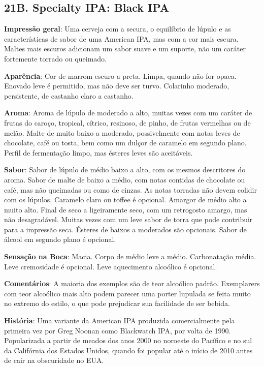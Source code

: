 \subsection*{21B. Specialty IPA: Black IPA}
\textbf{Impressão geral}: Uma cerveja com a secura, o equilíbrio de lúpulo e as características de sabor de uma American IPA, mas com a cor mais escura. Maltes mais escuros adicionam um sabor suave e um suporte, não um caráter fortemente torrado ou queimado.

\textbf{Aparência}: Cor de marrom escuro a preta. Limpa, quando não for opaca. Enovado leve é permitido, mas não deve ser turvo. Colarinho moderado, persistente, de castanho claro a castanho.

\textbf{Aroma}: Aroma de lúpulo de moderado a alto, muitas vezes com um caráter de frutas do caroço, tropical, cítrico, resinoso, de pinho, de frutas vermelhas ou de melão. Malte de muito baixo a moderado, possivelmente com notas leves de chocolate, café ou tosta, bem como um dulçor de caramelo em segundo plano. Perfil de fermentação limpo, mas ésteres leves são aceitáveis.

\textbf{Sabor}: Sabor de lúpulo de médio baixo a alto, com os mesmos descritores do aroma. Sabor de malte de baixo a médio, com notas contidas de chocolate ou café, mas não queimadas ou como de cinzas. As notas torradas não devem colidir com os lúpulos. Caramelo claro ou toffee é opcional. Amargor de médio alto a muito alto. Final de seco a ligeiramente seco, com um retrogosto amargo, mas não desagradável. Muitas vezes com um leve sabor de torra que pode contribuir para a impressão seca. Ésteres de baixos a moderados são opcionais. Sabor de álcool em segundo plano é opcional.

\textbf{Sensação na Boca}: Macia. Corpo de médio leve a médio. Carbonatação média. Leve cremosidade é opcional. Leve aquecimento alcoólico é opcional.

\textbf{Comentários}: A maioria dos exemplos são de teor alcoólico padrão. Exemplarers com teor alcoólico mais alto podem parecer uma porter lupulada se feita muito no extremo do estilo, o que pode prejudicar sua facilidade de ser bebida.

\textbf{História}: Uma variante da American IPA produzida comercialmente pela primeira vez por Greg Noonan como Blackwatch IPA, por volta de 1990. Popularizada a partir de meados dos anos 2000 no noroeste do Pacífico e no sul da Califórnia dos Estados Unidos, quando foi popular até o início de 2010 antes de cair na obscuridade no EUA.

